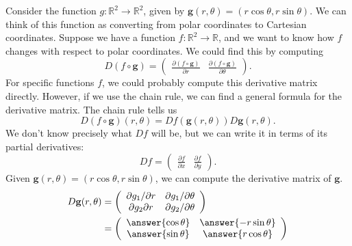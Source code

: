 \documentclass{ximera}
\begin{document}
\begin{example}
Consider the function $g:\mathbb{R}^2\rightarrow\mathbb{R}^2$, given by $\mathbf{g}(r,\theta) = (r\cos\theta, r\sin\theta)$. We can think of this function as converting from polar coordinates to Cartesian coordinates. Suppose we have a function $f:\mathbb{R}^2\rightarrow\mathbb{R}$, and we want to know how $f$ changes with respect to polar coordinates. We could find this by computing
\[
D(f\circ\mathbf{g}) = \left(\begin{array}{cc}\frac{\partial(f\circ \mathbf{g})}{\partial r} & \frac{\partial(f\circ \mathbf{g})}{\partial \theta}\end{array}\right).
\]
For specific functions $f$, we could probably compute this derivative matrix directly. However, if we use the chain rule, we can find a general formula for the derivative matrix. The chain rule tells us
\[
D(f\circ\mathbf{g})(r,\theta) = Df(\mathbf{g}(r,\theta))D\mathbf{g}(r,\theta).
\]
We don't know precisely what $Df$ will be, but we can write it in terms of its partial derivatives:
\[
Df = \left(\begin{array}{cc}\frac{\partial f}{\partial x} & \frac{\partial f}{\partial y} \end{array}\right).
\]
Given $\mathbf{g}(r,\theta) = (r\cos\theta, r\sin\theta)$, we can compute the derivative matrix of $\mathbf{g}$.
\begin{align*}
D\mathbf{g}(r,\theta) &= \left(\begin{array}{cc}
\partial g_1/\partial r & \partial g_1/\partial\theta\\
\partial g_2\partial r & \partial g_2/\partial\theta
\end{array}\right)\\
&= \left(\begin{array}{cc}
\answer{\cos\theta} & \answer{-r\sin\theta}\\
\answer{\sin\theta} & \answer{r\cos\theta}
\end{array}\right)
\end{align*}


\end{example}
\end{document}
